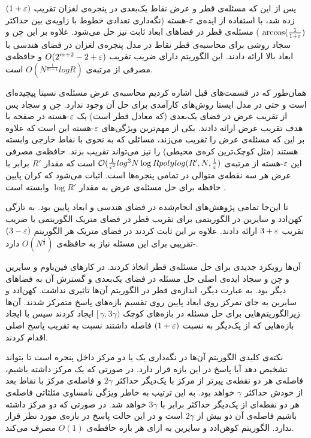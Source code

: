 پس از این که مسئله‌ی قطر و عرض نقاط یک‌بعدی در پنجره‌ی لغزان تقریب $(1+\varepsilon)$ زده شد، با استفاده از ایده‌ی $\varepsilon$-هسته  (نگه‌داری تعدادی خطوط با زاویه‌ی بین حداکثر
$\arccos (\frac{1}{1+\varepsilon})$
) 
مسئله‌ی قطر در فضاهای ابعاد ثابت نیز حل می‌شود. علاوه بر این چن و سجاد روشی برای محاسبه‌ی قطر نقاط در مدل پنجره‌ی لغزان در فضای هندسی با ابعاد بالا ارائه دادند. 
این الگوریتم دارای ضریب تقریب
$O(2^{m+2} -2 + \varepsilon)$
و حافظه‌ی مصرفی از مرتبه‌ی
$O(N^{\frac{1}{m+1}} log R)$
است. 

همان‌طور که در قسمت‌های قبل اشاره کردیم محاسبه‌ی عرض مسئله‌ی نسبتا پیچیده‌ای است و حتی در مدل ایستا روش‌های کارآمدی برای حل آن وجود ندارد. چن و سجاد پس از تقریب عرض در فضای یک‌بعدی (که معادل قطر است) یک $\varepsilon$-هسته در صفحه با هدف تقریب عرض ارائه دادند. یکی از مهم‌ترین ویژگی‌های $\varepsilon$-هسته این است که علاوه بر این که مسئله‌ی عرض را تقریب می‌زند، مسائلی که به نحوی با نقاط خارجی وابسته هستند (مثل کوچک‌ترین کره‌ی محیطی) را نیز می‌تواند تقریب بزند. حافظه‌ی مصرفی این $\varepsilon$-هسته از مرتبه‌ی 
$ \mathcal{O}(\frac{1}{\varepsilon^2} log^3 N \log R polylog(R', N, \frac{1}{\varepsilon})$
است که مقدار $R'$ برابر با عرض هر سه نقطه‌ی متوالی در تمامی پنجره‌ها است. اثبات می‌شود که کران پایین حافظه برای حل مسئله‌ی عرض به مقدار $\log R'$ وابسته است .

تا این‌جا تمامی پژوهش‌های انجام‌شده در فضای هندسی و ابعاد پایین بود. به تازگی کهن‌ادد و سایرین در  الگوریتمی برای تقریب قطر در فضای متریک الگوریتمی با ضریب تقریب $3 + \varepsilon$ ارائه دادند. علاوه بر این ثابت کردند در فضای متریک هر الگوریتم  $(3-\varepsilon)$-تقریبی برای این مسئله نیاز به حافظه‌ی $O(N^\frac{1}{3})$ دارد.

آن‌ها رویکرد جدیدی برای حل مسئله‌ی قطر اتخاذ کردند. در کارهای فین‌باوم و سایرین  و چن و سجاد  ایده‌ی اصلی حل مسئله در فضای یک‌بعدی و گسترش آن به فضاهای دیگر بود. به عبارت دیگر، اندازه‌ی قطر در الگوریتم آن‌ها تاثیری نداشت. کهن‌ادد و سایرین به جای تمرکز روی ابعاد پایین روی تقسیم بازه‌های پاسخ متمرکز شدند. آن‌ها زیرالگوریتم‌هایی برای حل مسئله در بازه‌های کوچک 
$ [\, \gamma, 3 \gamma)$
ایجاد کردند سپس با ایجاد بازه‌هایی که از یک‌دیگر به نسبت $(1+\varepsilon)$ فاصله داشتند نسبت به تقریب پاسخ اصلی اقدام کردند.

نکته‌ی کلیدی الگوریتم آن‌ها در نگه‌داری یک  یا دو مرکز داخل پنجره است تا بتواند تشخیص دهد آیا پاسخ در این بازه قرار دارد.  در صورتی که یک مرکز داشته باشیم، فاصله‌ی هر دو نقطه‌ی پیرتر از  مرکز با یک‌دیگر حداکثر $2 \gamma$ و فاصله‌ی مرکز با نقاط بعد از خودش حداکثر $\gamma$ خواهد بود. به این ترتیب به خاطر ویژگی نامساوی مثلثاتی فاصله‌ی هر دو نقطه‌ای از یک‌دیگر حداکثر برابر با $3 \gamma$ خواهد شد. در صورتی که دو مرکز داشته باشیم فاصله‌ی آن دو بیش از $2 \gamma$ است و در این حالت پاسخ در بازه‌ی مورد نظر قرار ندارد. الگوریتم کوهن‌ادد و سایرین به ازای هر بازه حافظه‌ی $O(1)$ مصرف می‌کند.

